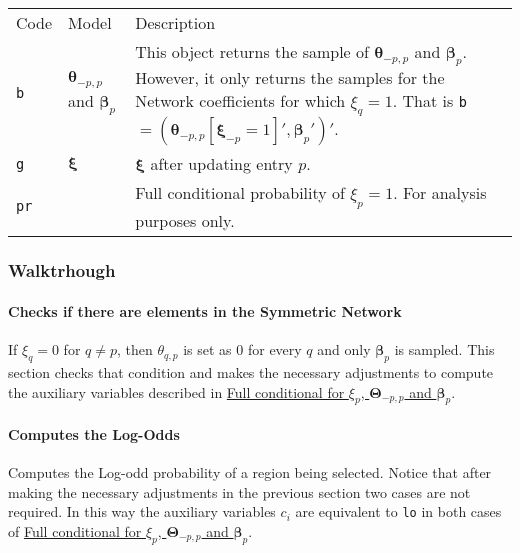 \documentclass[
]{article}
\begin{document}
\begin{longtable}[]{@{}
  >{\raggedleft\arraybackslash}p{}
  >{\centering\arraybackslash}p{}
  >{\raggedright\arraybackslash}p{}@{}}
\toprule\noalign{}
\endhead
\bottomrule\noalign{}
\endlastfoot
Code & Model & Description \\
\texttt{b} & \( {\boldsymbol \theta} _{-p,p}\) and
\( {\boldsymbol \beta} _p\) & This object returns the sample of \( {\boldsymbol \theta} _{-p,p}\) and \( {\boldsymbol \beta} _p\). However, it only
returns the samples for the Network coefficients for which \(\xi_q = 1\). That is
\texttt{b}\(=( {\boldsymbol \theta} _{-p,p}[ {\boldsymbol \xi} _{-p} = 1]', {\boldsymbol \beta} _p')'\). \\
\texttt{g} & \( {\boldsymbol \xi} \) & \( {\boldsymbol \xi} \) after updating entry \(p\). \\
\texttt{pr} & & Full conditional probability of \(\xi_p = 1\). For analysis purposes only. \\
\end{longtable}

\subsubsection{Walktrhough}\label{walktrhough}

\paragraph{Checks if there are elements in the Symmetric Network}\label{checks-if-there-are-elements-in-the-symmetric-network}

If \(\xi_q = 0\) for \(q \neq p\), then \(\theta_{q,p}\) is set as \(0\) for every \(q\)
and only \( {\boldsymbol \beta} _p\) is sampled. This section checks that condition and makes the
necessary adjustments to compute the auxiliary variables described in
\hyperref[full-conditional-for-xi_p-boldsymbol-theta-_-pp-and-boldsymbol-beta-_p]{Full conditional for \(\xi_p\), \( {\boldsymbol \Theta} _{-p,p}\) and \( {\boldsymbol \beta} _p\)}.

\paragraph{Computes the Log-Odds}\label{computes-the-log-odds}

Computes the Log-odd probability of a region being selected. Notice that after
making the necessary adjustments in the previous section two cases are not
required. In this way the auxiliary variables \(c_i\) are equivalent to \texttt{lo} in
both cases of
\hyperref[full-conditional-for-xi_p-boldsymbol-theta-_-pp-and-boldsymbol-beta-_p]{Full conditional for \(\xi_p\), \( {\boldsymbol \Theta} _{-p,p}\) and \( {\boldsymbol \beta} _p\)}.
\end{document}
